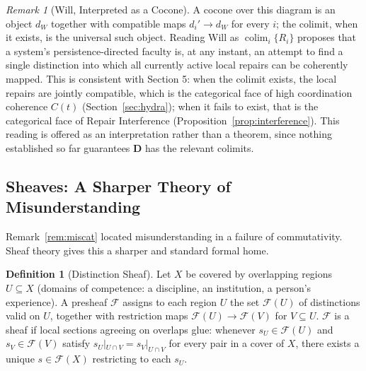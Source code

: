 \documentclass[11pt]{article}
\theoremstyle{plain}
\theoremstyle{definition}
\newtheorem{definition}[theorem]{Definition}
\theoremstyle{remark}
\newtheorem{remark}[theorem]{Remark}
\begin{document}
\begin{remark}[Will, Interpreted as a Cocone]
\label{rem:will}
A cocone over this diagram is an object $d_W$ together with compatible maps $d_i' \to d_W$ for every $i$; the colimit, when it exists, is the universal such object. Reading Will as $\operatorname{colim}_i \{R_i\}$ proposes that a system's persistence-directed faculty is, at any instant, an attempt to find a single distinction into which all currently active local repairs can be coherently mapped. This is consistent with Section 5: when the colimit exists, the local repairs are jointly compatible, which is the categorical face of high coordination coherence $C(t)$ (Section~\ref{sec:hydra}); when it fails to exist, that is the categorical face of Repair Interference (Proposition~\ref{prop:interference}). This reading is offered as an interpretation rather than a theorem, since nothing established so far guarantees $\mathbf{D}$ has the relevant colimits.
\end{remark}

\subsection{Sheaves: A Sharper Theory of Misunderstanding}
\label{sec:sheaf}

Remark~\ref{rem:miscat} located misunderstanding in a failure of commutativity. Sheaf theory gives this a sharper and standard formal home.

\begin{definition}[Distinction Sheaf]
Let $X$ be covered by overlapping regions $U \subseteq X$ (domains of competence: a discipline, an institution, a person's experience). A presheaf $\mathscr{F}$ assigns to each region $U$ the set $\mathscr{F}(U)$ of distinctions valid on $U$, together with restriction maps $\mathscr{F}(U) \to \mathscr{F}(V)$ for $V \subseteq U$. $\mathscr{F}$ is a sheaf if local sections agreeing on overlaps glue: whenever $s_U \in \mathscr{F}(U)$ and $s_V \in \mathscr{F}(V)$ satisfy $s_U|_{U\cap V} = s_V|_{U \cap V}$ for every pair in a cover of $X$, there exists a unique $s \in \mathscr{F}(X)$ restricting to each $s_U$.
\end{definition}
\end{document}
